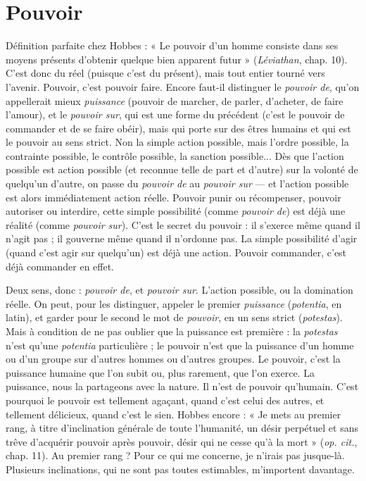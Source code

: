 \section{Pouvoir}
Définition parfaite chez Hobbes : « Le pouvoir d’un homme
consiste dans ses moyens présents d’obtenir quelque bien apparent
futur » ({\it Léviathan}, chap. 10). C’est donc du réel (puisque c’est du présent),
mais tout entier tourné vers l'avenir. Pouvoir, c’est pouvoir faire. Encore
faut-il distinguer le {\it pouvoir de}, qu’on appellerait mieux {\it puissance} (pouvoir de
marcher, de parler, d’acheter, de faire l'amour), et le {\it pouvoir sur}, qui est une
forme du précédent (c’est le pouvoir de commander et de se faire obéir), mais
qui porte sur des êtres humains et qui est le pouvoir au sens strict. Non la
simple action possible, mais l’ordre possible, la contrainte possible, le contrôle
possible, la sanction possible... Dès que l’action possible est action possible (et
reconnue telle de part et d’autre) sur la volonté de quelqu'un d’autre, on passe
du {\it pouvoir de} au {\it pouvoir sur} — et l’action possible est alors immédiatement
action réelle. Pouvoir punir ou récompenser, pouvoir autoriser ou interdire,
cette simple possibilité (comme {\it pouvoir de}) est déjà une réalité (comme {\it pouvoir
sur}). C’est le secret du pouvoir : il s'exerce même quand il n’agit pas ; il gouverne
même quand il n’ordonne pas. La simple possibilité d’agir (quand c’est
agir sur quelqu'un) est déjà une action. Pouvoir commander, c’est déjà commander
en effet.

Deux sens, donc : {\it pouvoir de}, et {\it pouvoir sur}. L'action possible, ou la domination
réelle. On peut, pour les distinguer, appeler le premier {\it puissance}
({\it potentia}, en latin), et garder pour le second le mot de {\it pouvoir}, en un sens strict
({\it potestas}). Mais à condition de ne pas oublier que la puissance est première : la
{\it potestas} n'est qu'une {\it potentia} particulière ; le pouvoir n’est que la puissance
d'un homme ou d’un groupe sur d’autres hommes ou d’autres groupes. Le
pouvoir, c’est la puissance humaine que l’on subit ou, plus rarement, que l'on
exerce. La puissance, nous la partageons avec la nature. Il n’est de pouvoir
qu’humain. C’est pourquoi le pouvoir est tellement agaçant, quand c’est celui
des autres, et tellement délicieux, quand c’est le sien. Hobbes encore : « Je
mets au premier rang, à titre d’inclination générale de toute l'humanité, un
désir perpétuel et sans trêve d’acquérir pouvoir après pouvoir, désir qui ne cesse
qu’à la mort » ({\it op. cit.}, chap. 11). Au premier rang ? Pour ce qui me concerne,
je n’irais pas jusque-là. Plusieurs inclinations, qui ne sont pas toutes estimables,
m'importent davantage.

